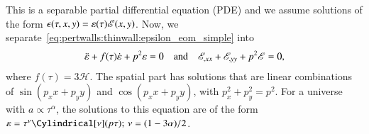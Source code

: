 This is a separable partial differential equation (PDE) and we assume solutions of the form $\epsilon(\tau, x, y) = \varepsilon(\tau)\mathscr{E}(x,y)$. Now, we separate~\cref{eq:pertwalls:thinwall:epsilon_eom_simple} into
    \begin{align}\label{eq:pertwalls:thinwall:varepsilon_and_E_eoms}
        \ddot{\varepsilon} + f(\tau) \dot{\varepsilon} + p^2 \varepsilon = 0 \quad\text{and}\quad  \mathscr{E}_{,xx} + \mathscr{E}_{,yy} + p^2 \mathscr{E} = 0,
    \end{align}
where $f(\tau)=3\mathcal{H}$. %
%
The spatial part has solutions that are linear combinations of $\sin{(p_x x+p_y y)}$ and $\cos{(p_x x+p_y y)}$, with $p_x^2+p_y^2 = p^2$. 
For a universe with $a\propto \tau^\alpha$, the solutions to this equation are of the form $\varepsilon = \tau^\nu \Cylindrical[\nu](p\tau); \, \nu=(1-3\alpha)/2$.


